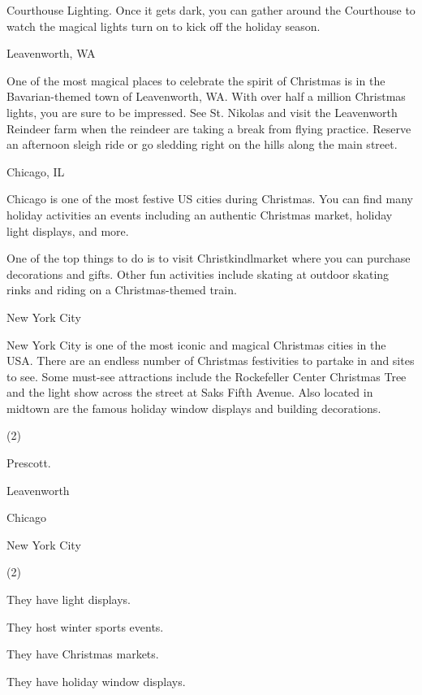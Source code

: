 \documentclass{英语试卷}
\begin{document}
\par Courthouse Lighting. Once it gets dark, you can gather around the Courthouse to watch the magical lights turn on to kick off the holiday season.\par
\par Leavenworth, WA\par
\par One of the most magical places to celebrate the spirit of Christmas is in the Bavarian-themed town of Leavenworth, WA. With over half a million Christmas lights, you are sure to be impressed. See St. Nikolas and visit the Leavenworth Reindeer farm when the reindeer are taking a break from flying practice. Reserve an afternoon sleigh ride or go sledding right on the hills along the main street.\par
\par Chicago, IL\par
\par Chicago is one of the most festive US cities during Christmas. You can find many holiday activities an events including an authentic Christmas market, holiday light displays, and more.\par
\par One of the top things to do is to visit Christkindlmarket where you can purchase decorations and gifts. Other fun activities include skating at outdoor skating rinks and riding on a Christmas-themed train.\par
\par New York City\par
\par New York City is one of the most iconic and magical Christmas cities in the USA. There are an endless number of Christmas festivities to partake in and sites to see. Some must-see attractions include the Rockefeller Center Christmas Tree and the light show across the street at Saks Fifth Avenue. Also located in midtown are the famous holiday window displays and building decorations.\par
{}
\begin{choices}(2)
  \item Prescott.
  \item Leavenworth
  \item Chicago
  \item New York City
\end{choices}
\begin{choices}(2)
  \item They have light displays.
  \item They host winter sports events.
  \item They have Christmas markets.
  \item They have holiday window displays.
\end{choices}
\end{document}
